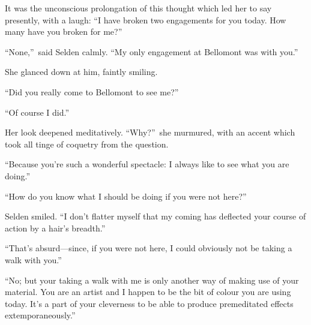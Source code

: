\documentclass[12pt,a4paper]{book}
\begin{document}
It was the unconscious prolongation of this thought which led her
to say presently, with a laugh: ``I have broken two engagements
for you today. How many have you broken for me?''





``None,''\ said Selden calmly. ``My only engagement at Bellomont was
with you.''





She glanced down at him, faintly smiling.





``Did you really come to Bellomont to see me?''





``Of course I did.''





Her look deepened meditatively. ``Why?''\ she murmured, with an
accent which took all tinge of coquetry from the question.





``Because you're such a wonderful spectacle: I always like to see
what you are doing.''





``How do you know what I should be doing if you were not here?''





Selden smiled. ``I don't flatter myself that my coming has
deflected your course of action by a hair's breadth.''





``That's absurd---since, if you were not here, I could obviously
not be taking a walk with you.''





``No; but your taking a walk with me is only another way of making
use of your material. You are an artist and I happen to be the
bit of colour you are using today. It's a part of your cleverness
to be able to produce premeditated effects extemporaneously.''
\end{document}
